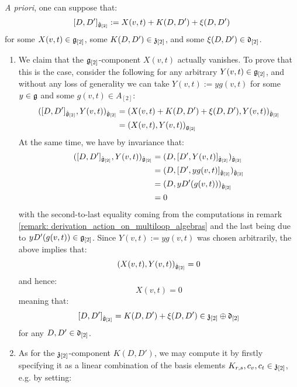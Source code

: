 \begin{remark}
            \textit{A priori}, one can suppose that:
                $$[D, D']_{\hat{\mathfrak{g}}_{[2]}} := X(v, t) + K(D, D') + \xi(D, D')$$
            for some $X(v, t) \in \mathfrak{g}_{[2]}$, some $K(D, D') \in \mathfrak{z}_{[2]}$, and some $\xi(D, D') \in \mathfrak{d}_{[2]}$. 
            \begin{enumerate}
                \item We claim that the $\mathfrak{g}_{[2]}$-component $X(v, t)$ actually vanishes. To prove that this is the case, consider the following for any arbitrary $Y(v, t) \in \mathfrak{g}_{[2]}$, and without any loss of generality we can take $Y(v, t) := y g(v, t)$ for some $y \in \mathfrak{g}$ and some $g(v, t) \in A_{[2]}$:
                    $$
                        \begin{aligned}
                            ( [D, D']_{\hat{\mathfrak{g}}_{[2]}}, Y(v, t) )_{\hat{\mathfrak{g}}_{[2]}} & = ( X(v, t) + K(D, D') + \xi(D, D'), Y(v, t) )_{\hat{\mathfrak{g}}_{[2]}}
                            \\
                            & = (X(v, t), Y(v, t))_{\mathfrak{g}_{[2]}}
                        \end{aligned}
                    $$
                At the same time, we have by invariance that:
                    $$
                        \begin{aligned}
                            ( [D, D']_{\hat{\mathfrak{g}}_{[2]}}, Y(v, t) )_{\hat{\mathfrak{g}}_{[2]}} & = ( D, [D', Y(v, t)]_{\hat{\mathfrak{g}}_{[2]}} )_{\hat{\mathfrak{g}}_{[2]}}
                            \\
                            & = ( D, [D', y g(v, t)]_{\hat{\mathfrak{g}}_{[2]}} )_{\hat{\mathfrak{g}}_{[2]}}
                            \\
                            & = ( D, y D'(g(v, t)) )_{\hat{\mathfrak{g}}_{[2]}}
                            \\
                            & = 0
                        \end{aligned}
                    $$
                with the second-to-last equality coming from the computations in remark \ref{remark: derivation_action_on_multiloop_algebras} and the last being due to $y D'(g(v, t)) \in \mathfrak{g}_{[2]}$. Since $Y(v, t) := y g(v, t)$ was chosen arbitrarily, the above implies that:
                    $$(X(v, t), Y(v, t))_{\hat{\mathfrak{g}}_{[2]}} = 0$$
                and hence:
                    $$X(v, t) = 0$$
                meaning that:
                    $$[D, D']_{\hat{\mathfrak{g}}_{[2]}} = K(D, D') + \xi(D, D') \in \mathfrak{z}_{[2]} \oplus \mathfrak{d}_{[2]}$$
                for any $D, D' \in \mathfrak{d}_{[2]}$. 
                \item As for the $\mathfrak{z}_{[2]}$-component $K(D, D')$, we may compute it by firstly specifying it as a linear combination of the basis elements $K_{r, s}, c_v, c_t \in \mathfrak{z}_{[2]}$, e.g. by setting:

\end{enumerate}
\end{remark}
